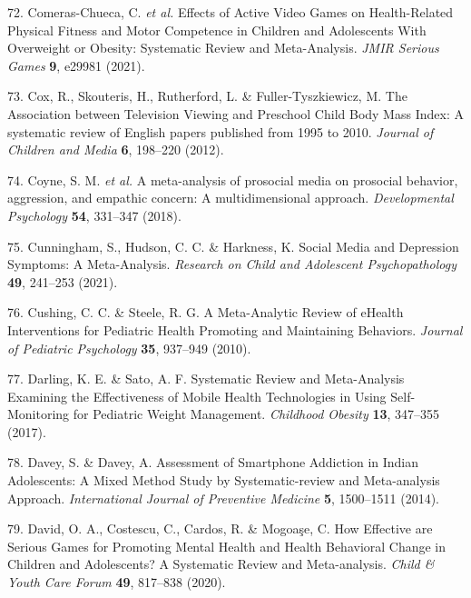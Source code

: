 \documentclass[
  english,
  man]{apa6}
\newenvironment{cslreferences}%
  {}%
  {\par}
\begin{document}
\begin{cslreferences}
\leavevmode\hypertarget{ref-comeras-chuecaEffectsActiveVideo2021a}{}%
72. Comeras-Chueca, C. \emph{et al.} Effects of Active Video Games on Health-Related Physical Fitness and Motor Competence in Children and Adolescents With Overweight or Obesity: Systematic Review and Meta-Analysis. \emph{JMIR Serious Games} \textbf{9}, e29981 (2021).

\leavevmode\hypertarget{ref-coxAssociationTelevisionViewing2012}{}%
73. Cox, R., Skouteris, H., Rutherford, L. \& Fuller-Tyszkiewicz, M. The Association between Television Viewing and Preschool Child Body Mass Index: A systematic review of English papers published from 1995 to 2010. \emph{Journal of Children and Media} \textbf{6}, 198--220 (2012).

\leavevmode\hypertarget{ref-coyneMetaanalysisProsocialMedia2018}{}%
74. Coyne, S. M. \emph{et al.} A meta-analysis of prosocial media on prosocial behavior, aggression, and empathic concern: A multidimensional approach. \emph{Developmental Psychology} \textbf{54}, 331--347 (2018).

\leavevmode\hypertarget{ref-cunninghamSocialMediaDepression2021}{}%
75. Cunningham, S., Hudson, C. C. \& Harkness, K. Social Media and Depression Symptoms: A Meta-Analysis. \emph{Research on Child and Adolescent Psychopathology} \textbf{49}, 241--253 (2021).

\leavevmode\hypertarget{ref-cushingMetaAnalyticReviewEHealth2010}{}%
76. Cushing, C. C. \& Steele, R. G. A Meta-Analytic Review of eHealth Interventions for Pediatric Health Promoting and Maintaining Behaviors. \emph{Journal of Pediatric Psychology} \textbf{35}, 937--949 (2010).

\leavevmode\hypertarget{ref-darlingSystematicReviewMetaAnalysis2017}{}%
77. Darling, K. E. \& Sato, A. F. Systematic Review and Meta-Analysis Examining the Effectiveness of Mobile Health Technologies in Using Self-Monitoring for Pediatric Weight Management. \emph{Childhood Obesity} \textbf{13}, 347--355 (2017).

\leavevmode\hypertarget{ref-daveyAssessmentSmartphoneAddiction2014}{}%
78. Davey, S. \& Davey, A. Assessment of Smartphone Addiction in Indian Adolescents: A Mixed Method Study by Systematic-review and Meta-analysis Approach. \emph{International Journal of Preventive Medicine} \textbf{5}, 1500--1511 (2014).

\leavevmode\hypertarget{ref-davidHowEffectiveAre2020}{}%
79. David, O. A., Costescu, C., Cardos, R. \& Mogoaşe, C. How Effective are Serious Games for Promoting Mental Health and Health Behavioral Change in Children and Adolescents? A Systematic Review and Meta-analysis. \emph{Child \& Youth Care Forum} \textbf{49}, 817--838 (2020).


\end{cslreferences}
\end{document}
